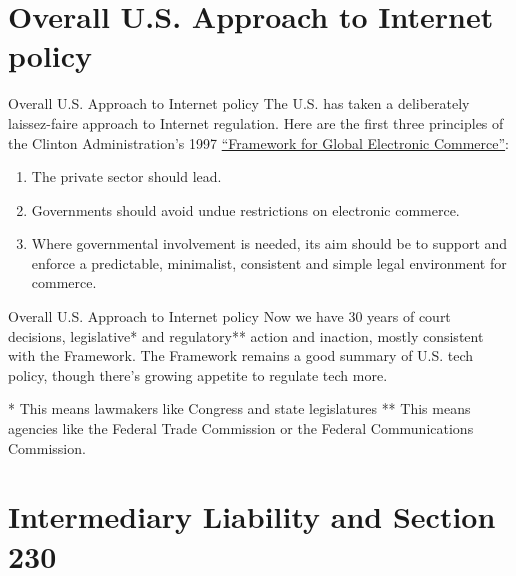 \documentclass[nobackground,dvipsnames,table]{beamer}
\begin{document}
\section{Overall U.S. Approach to Internet policy}
\begin{frame}{Overall U.S. Approach to Internet policy}
	The U.S. has taken a deliberately laissez-faire approach to Internet regulation. \newline
        \newline Here are the first three principles of the Clinton Administration’s 1997 \href{https://clintonwhitehouse4.archives.gov/WH/New/Commerce/read.html}{“Framework for Global Electronic Commerce”}: 
        \begin{enumerate}
            \item The private sector should lead.
            \item  Governments should avoid undue restrictions on electronic commerce.
            \item Where governmental involvement is needed, its aim should be to support and enforce a predictable, minimalist, consistent and simple legal environment for commerce.
        \end{enumerate}
\end{frame}

\begin{frame}{Overall U.S. Approach to Internet policy}
	Now we have 30 years of court decisions, legislative* and regulatory** action and inaction, mostly consistent with the Framework. \newline \newline The Framework remains a good summary of U.S. tech policy, though there’s growing appetite to regulate tech more.\newline\newline

    \footnotesize{* This means lawmakers like Congress and state legislatures}
    \newline
    \footnotesize{** This means agencies like the Federal Trade Commission or the Federal Communications Commission.}
\end{frame}



\section{Intermediary Liability and Section 230}
\end{document}
